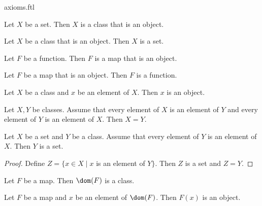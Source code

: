 \documentclass{stex}
\begin{document}
\begin{smodule}{axioms.ftl}
  \begin{forthel}

    \begin{lemma}
      Let $X$ be a set.
      Then $X$ is a class that is an object.
    \end{lemma}

    \begin{lemma}
      Let $X$ be a class that is an object.
      Then $X$ is a set.
    \end{lemma}



    \begin{lemma}
      Let $F$ be a function.
      Then $F$ is a map that is an object.
    \end{lemma}

    \begin{lemma}
      Let $F$ be a map that is an object.
      Then $F$ is a function.
    \end{lemma}



    \begin{lemma}
      Let $X$ be a class and $x$ be an element of $X$.
      Then $x$ is an object.
    \end{lemma}

    \begin{lemma}
      Let $X, Y$ be classes.
      Assume that every element of $X$ is an element of $Y$ and every element of
      $Y$ is an element of $X$.
      Then $X = Y$.
    \end{lemma}

    \begin{lemma}
      Let $X$ be a set and $Y$ be a class.
      Assume that every element of $Y$ is an element of $X$.
      Then $Y$ is a set.
    \end{lemma}
    \begin{proof}
      Define $Z = \{ x \in X \mid x$ is an element of $Y \}$.
      Then $Z$ is a set and $Z = Y$.
    \end{proof}



    \begin{lemma}
      Let $F$ be a map.
      Then $\dom(F)$ is a class.
    \end{lemma}

    \begin{lemma}
      Let $F$ be a map and $x$ be an element of $\dom(F)$.
      Then $F(x)$ is an object.
    \end{lemma}


\end{forthel}
\end{smodule}
\end{document}
